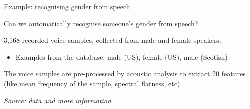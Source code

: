 \documentclass[compress]{beamer}
\newcommand{\source}[2]{{\tiny\it Source: \href{#1}{#2}}}
\begin{document}
\begin{frame}{Example: recognising gender from speech}

Can we automatically recognise someone's gender from speech?

3,168 recorded voice samples, collected from male and female speakers.

\begin{itemize}

\item Examples from the database: male (US), female (US), male (Scotish)
\end{itemize}

    \begin{center}
    \hspace{0.3em}
    \hspace{0.3em}
    \end{center}


The voice samples are pre-processed by acoustic analysis to extract 20 features
(like mean frequency of the sample, spectral flatness, etc).


\source{https://www.kaggle.com/primaryobjects/voicegender}{data and more information}


\end{frame}
\end{document}

